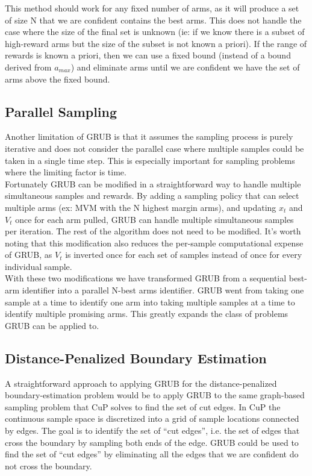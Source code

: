 \documentclass{article}[12pt]
\begin{document}
This method should work for any fixed number of arms, as it will produce a set of size N that we are confident contains the best arms.
This does not handle the case where the size of the final set is unknown
(ie: if we know there is a subset of high-reward arms but the size of the subset is not known a priori).
If the range of rewards is known a priori, then we can use a fixed bound (instead of a bound derived from $a_{max}$) and eliminate arms until we are confident we have the set of arms above the fixed bound.

\subsection{Parallel Sampling}

Another limitation of GRUB is that it assumes the sampling process is purely iterative and does not consider the parallel case where multiple samples could be taken in a single time step.
This is especially important for sampling problems where the limiting factor is time. \\

Fortunately GRUB can be modified in a straightforward way to handle multiple simultaneous samples and rewards.
By adding a sampling policy that can select multiple arms (ex: MVM with the N highest margin arms), and updating $x_t$ and $V_t$ once for each arm pulled,
GRUB can handle multiple simultaneous samples per iteration.
The rest of the algorithm does not need to be modified.
It’s worth noting that this modification also reduces the per-sample computational expense of GRUB,
as $V_t$ is inverted once for each set of samples instead of once for every individual sample. \\

With these two modifications we have transformed GRUB from a sequential best-arm identifier into a parallel N-best arms identifier.
GRUB went from taking one sample at a time to identify one arm into taking multiple samples at a time to identify multiple promising arms.
This greatly expands the class of problems GRUB can be applied to.

\subsection{Distance-Penalized Boundary Estimation}

A straightforward approach to applying GRUB for the distance-penalized boundary-estimation problem would be to apply GRUB to the same graph-based sampling problem that CuP solves to find the set of cut edges.
In CuP the continuous sample space is discretized into a grid of sample locations connected by edges.
The goal is to identify the set of ``cut edges'', i.e. the set of edges that cross the boundary by sampling both ends of the edge.
GRUB could be used to find the set of ``cut edges'' by eliminating all the edges that we are confident do not cross the boundary. \\
\end{document}
